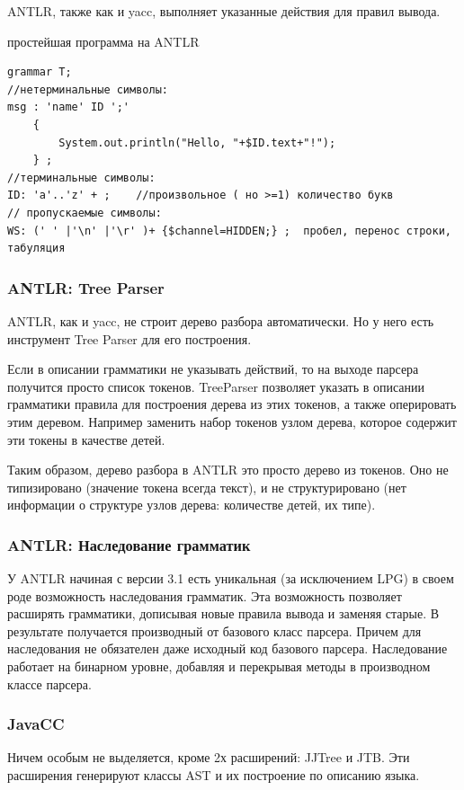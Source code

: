 \documentclass[a4paper,12pt]{article}
\begin{document}
ANTLR, также как и yacc, выполняет указанные действия для правил вывода.

\begin{example}
простейшая программа на ANTLR
\end{example}
\begin{verbatim}
grammar T;
//нетерминальные символы:
msg : 'name' ID ';' 
	{
		System.out.println("Hello, "+$ID.text+"!");
	} ;
//терминальные символы:
ID: 'a'..'z' + ;	//произвольное ( но >=1) количество букв
// пропускаемые символы:
WS: (' ' |'\n' |'\r' )+ {$channel=HIDDEN;} ;  пробел, перенос строки, табуляция
\end{verbatim}

\subsubsection*{ANTLR: Tree Parser}
ANTLR, как и yacc, не строит дерево разбора автоматически. Но у него есть
инструмент Tree Parser для его построения.

Если в описании грамматики не указывать действий, то на выходе парсера получится
просто список токенов. TreeParser позволяет указать в описании грамматики
правила для построения дерева из этих токенов, а также оперировать этим деревом.
Например заменить набор токенов узлом дерева, которое содержит эти токены в
качестве детей.

Таким образом, дерево разбора в ANTLR это просто дерево из токенов. Оно не
типизировано (значение токена всегда текст), и не структурировано (нет
информации о структуре узлов дерева: количестве детей, их типе).

\subsubsection*{ANTLR: Наследование грамматик}
У ANTLR начиная с версии 3.1 есть уникальная (за исключением LPG) в своем роде
возможность наследования грамматик. Эта возможность позволяет расширять
грамматики, дописывая новые правила вывода и заменяя старые. В результате
получается производный от базового класс парсера. Причем для наследования не
обязателен даже исходный код базового парсера. Наследование работает на
бинарном уровне, добавляя и перекрывая методы в производном классе парсера.

\subsubsection*{JavaCC}
Ничем особым не выделяется, кроме 2х расширений: JJTree и JTB. Эти расширения
генерируют классы AST и их построение по описанию языка.
\end{document}
